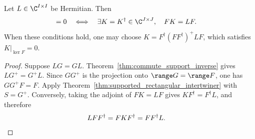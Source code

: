 \begin{theorem}
    \label{thm:hermitian_rectangular_lift}
    \leanok
    Let $L\in\C^{I\times I}$ be Hermitian. Then
    \begin{align}
        [L,FF^\dagger]=0
        &\quad\Longleftrightarrow\quad
        \exists K=K^\dagger\in\C^{J\times J},\quad FK=LF.
        \label{eq:representations_hermitian_lift}
    \end{align}
    When these conditions hold, one may choose
    $K=F^\dagger(FF^\dagger)^+LF$, which satisfies $K|_{\ker F}=0$.
\end{theorem}
\begin{proof}\leanok
    Suppose $LG=GL$. Theorem~\ref{thm:commute_support_inverse} gives
    $LG^+=G^+L$. Since $GG^+$ is the projection onto
    $\range G=\range F$, one has $GG^+F=F$.
    Apply Theorem~\ref{thm:supported_rectangular_intertwiner} with $S=G^+$.
    Conversely, taking the adjoint of $FK=LF$ gives
    $KF^\dagger=F^\dagger L$, and therefore
    \begin{align}
        LFF^\dagger&=FKF^\dagger=FF^\dagger L.
        \notag
    \end{align}
\end{proof}
